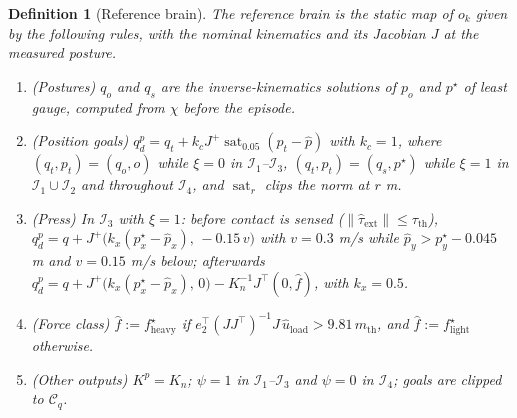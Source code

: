 \documentclass[11pt]{article}\usepackage[margin=1in]{geometry}\usepackage{amsmath,amssymb,amsthm,mathtools}\usepackage{graphicx}\graphicspath{{figures/}{../figures/}{figs/}{./}}\usepackage{enumitem}\usepackage{hyperref}\usepackage{cleveref}\usepackage{tikz}\usetikzlibrary{arrows.meta,positioning,calc,shapes.geometric}\usepackage{float}\usepackage{rotating}\usepackage[most]{tcolorbox}\usepackage{kotex}\usepackage{booktabs}\usepackage{longtable}\emergencystretch=1.6em\tolerance=2000 \crefname{assumption}{Assumption}{Assumptions}\Crefname{assumption}{Assumption}{Assumptions}\crefname{definition}{Definition}{Definitions}\Crefname{definition}{Definition}{Definitions}\crefname{proposition}{Proposition}{Propositions}\Crefname{proposition}{Proposition}{Propositions}\crefname{fact}{Fact}{Facts}\Crefname{fact}{Fact}{Facts} \newtheorem{assumption}{Assumption}\newtheorem{definition}{Definition}\newtheorem{lemma}{Lemma}\newtheorem{proposition}{Proposition}\newtheorem{theorem}{Theorem}\newtheorem{corollary}{Corollary}\newtheorem{fact}{Fact}\theoremstyle{remark}\newtheorem{remark}{Remark} \newcommand{\R}{\mathbb{R}}\newcommand{\xb}{\bar x}\newcommand{\Ab}{\bar A}\newcommand{\By}{\bar B_y}\newcommand{\U}{\mathcal U}\newcommand{\Z}{\mathcal Z}
\begin{document}
\begin{definition}[Reference brain]
\label{def:refbrain}
The reference brain is the static map of $o_k$ given by the following rules, with the nominal kinematics and its Jacobian $J$ at the measured posture.
\begin{enumerate}[label=(\roman*)]
\item (Postures) $q_o$ and $q_s$ are the inverse-kinematics solutions of $p_o$ and $p^\star$ of least gauge, computed from $\chi$ before the episode.
\item (Position goals) $q_d^p=q_t+k_cJ^+\operatorname{sat}_{0.05}(p_t-\hat p)$ with $k_c=1$, where $(q_t,p_t)=(q_o,o)$ while $\xi=0$ in $\mathcal I_1$--$\mathcal I_3$, $(q_t,p_t)=(q_s,p^\star)$ while $\xi=1$ in $\mathcal I_1\cup\mathcal I_2$ and throughout $\mathcal I_4$, and $\operatorname{sat}_r$ clips the norm at $r$ m.
\item (Press) In $\mathcal I_3$ with $\xi=1$: before contact is sensed ($\|\hat\tau_{\mathrm{ext}}\|\le\tau_{\mathrm{th}}$), $q_d^p=q+J^+\big(k_x(p^\star_x-\hat p_x),\,-0.15\,v\big)$ with $v=0.3$ m/s while $\hat p_y>p^\star_y-0.045$ m and $v=0.15$ m/s below; afterwards $q_d^p=q+J^+\big(k_x(p^\star_x-\hat p_x),\,0\big)-K_n^{-1}J^\top(0,\hat f)$, with $k_x=0.5$.
\item (Force class) $\hat f:=f^\star_{\mathrm{heavy}}$ if $e_2^\top(JJ^\top)^{-1}J\,\hat u_{\mathrm{load}}>9.81\,m_{\mathrm{th}}$, and $\hat f:=f^\star_{\mathrm{light}}$ otherwise.
\item (Other outputs) $K^p=K_n$; $\psi=1$ in $\mathcal I_1$--$\mathcal I_3$ and $\psi=0$ in $\mathcal I_4$; goals are clipped to $\mathcal C_q$.
\end{enumerate}
\end{definition}
\end{document}
